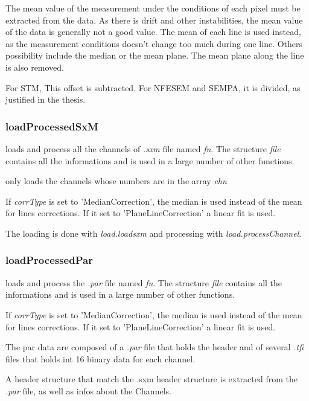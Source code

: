 The mean value of the measurement under the conditions of each pixel must be extracted from the data. As there is drift and other instabilities, the mean value of the data is generally not a good value. The mean of each line is used instead, as the measurement conditions doesn't change too much during one line. Others possibility include the median or the mean plane. The mean plane along the line is also removed.

For STM, This offset is subtracted. For NFESEM and SEMPA, it is divided, as justified in the thesis.

\subsubsection{loadProcessedSxM}
\bdf
{} loads and process all the channels of \emph{.sxm} file named \emph{fn}. The structure \emph{file} contains all the informations and is used in a large number of other functions.

 only loads the channels whose numbers are in the array \emph{chn}

 If \emph{corrType} is set to 'MedianCorrection', the median is used instead of the mean for lines corrections. If it set to 'PlaneLineCorrection' a linear fit is used. 

\edf

The loading is done with \emph{load.loadsxm} and processing with \emph{load.processChannel}.

\subsubsection{loadProcessedPar}
\bdf
{} loads and process the \emph{.par} file named \emph{fn}. The structure \emph{file} contains all the informations and is used in a large number of other functions.

 If \emph{corrType} is set to 'MedianCorrection', the median is used instead of the mean for lines corrections. If it set to 'PlaneLineCorrection' a linear fit is used. 

\edf

The par data are composed of a \emph{.par} file that holds the header and of several \emph{.tfi} files that holds int 16 binary data for each channel. 

A header structure that match the .sxm header structure is extracted from the \emph{.par} file, as well as infos about the Channels.
